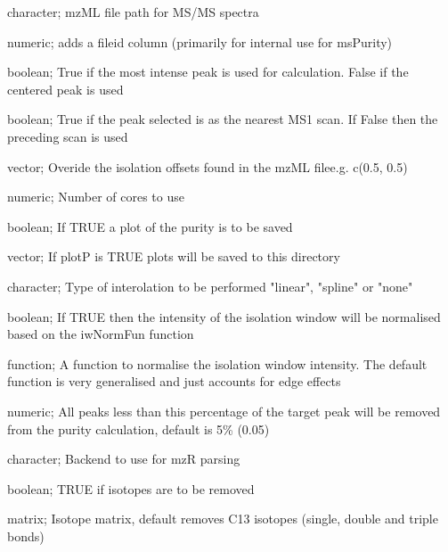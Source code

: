 \documentclass[letterpaper]{book}
\begin{document}
\begin{Arguments}
\begin{ldescription}
\item[\code{filepth}] character; mzML file path for MS/MS spectra

\item[\code{fileid}] numeric; adds a fileid column (primarily for internal use for msPurity)

\item[\code{mostIntense}] boolean; True if the most intense peak is used for calculation. False if the centered peak is used

\item[\code{nearest}] boolean; True if the peak selected is as the nearest MS1 scan. If False then the preceding scan is used

\item[\code{offsets}] vector; Overide the isolation offsets found in the mzML filee.g. c(0.5, 0.5)

\item[\code{cores}] numeric; Number of cores to use

\item[\code{plotP}] boolean; If TRUE a plot of the purity is to be saved

\item[\code{plotdir}] vector; If plotP is TRUE plots will be saved to this directory

\item[\code{interpol}] character; Type of interolation to be performed "linear", "spline" or "none"

\item[\code{iwNorm}] boolean; If TRUE then the intensity of the isolation window will be normalised based on the iwNormFun function

\item[\code{iwNormFun}] function; A function to normalise the isolation window intensity. The default function is very generalised and just accounts for edge effects

\item[\code{ilim}] numeric; All peaks less than this percentage of the target peak will be removed from the purity calculation, default is 5\% (0.05)

\item[\code{mzRback}] character; Backend to use for mzR parsing

\item[\code{isotopes}] boolean; TRUE if isotopes are to be removed

\item[\code{im}] matrix; Isotope matrix, default removes C13 isotopes (single, double and triple bonds)
\end{ldescription}
\end{Arguments}
\end{document}
